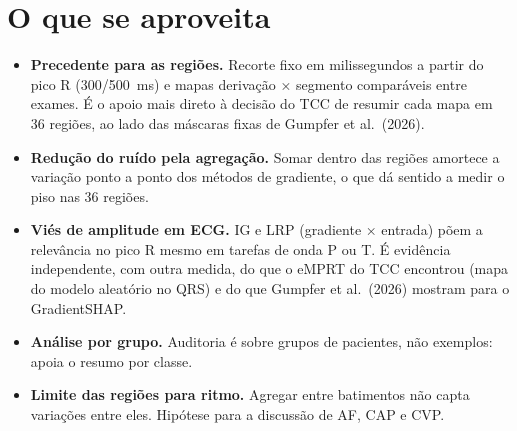 \documentclass[11pt,a4paper]{article}
\begin{document}
\section{O que se aproveita}
\begin{itemize}
\item \textbf{Precedente para as regiões.} Recorte fixo em milissegundos a partir do pico R (300/500~ms) e mapas derivação × segmento comparáveis entre exames. É o apoio mais direto à decisão do TCC de resumir cada mapa em 36 regiões, ao lado das máscaras fixas de Gumpfer et al.\ (2026).
\item \textbf{Redução do ruído pela agregação.} Somar dentro das regiões amortece a variação ponto a ponto dos métodos de gradiente, o que dá sentido a medir o piso nas 36 regiões.
\item \textbf{Viés de amplitude em ECG.} IG e LRP (gradiente × entrada) põem a relevância no pico R mesmo em tarefas de onda P ou T. É evidência independente, com outra medida, do que o eMPRT do TCC encontrou (mapa do modelo aleatório no QRS) e do que Gumpfer et al.\ (2026) mostram para o GradientSHAP.
\item \textbf{Análise por grupo.} Auditoria é sobre grupos de pacientes, não exemplos: apoia o resumo por classe.
\item \textbf{Limite das regiões para ritmo.} Agregar entre batimentos não capta variações entre eles. Hipótese para a discussão de AF, CAP e CVP.
\end{itemize}
\end{document}
